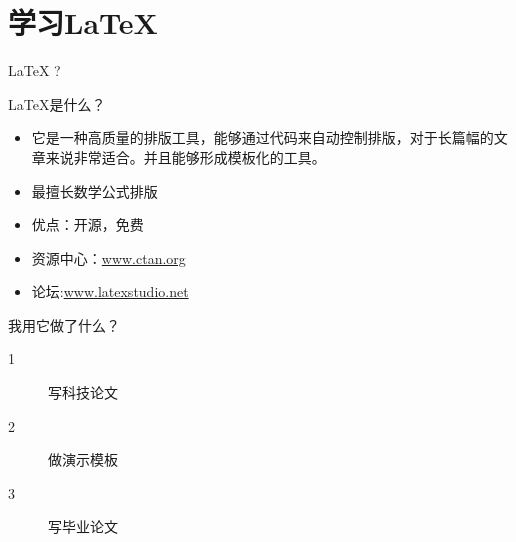 \documentclass{beamer}
\begin{document}
\section{学习\LaTeX{}}

	\begin{frame}{\LaTeX{} ?}
		\begin{block}{\LaTeX{}是什么？}
			\begin{itemize}[<+->]
				\item 它是一种高质量的排版工具，能够通过代码来自动控制排版，对于长篇幅的文章来说非常适合。并且能够形成模板化的工具。
				\item 最擅长数学公式排版
				\item 优点：开源，免费 
				\item 资源中心：\url{www.ctan.org}
				\item 论坛:\url{www.latexstudio.net}
			\end{itemize}
			
		\end{block}
		\pause
		\begin{exampleblock}{我用它做了什么？}
			\begin{description}
				\item[1] 写科技论文
				\item[2] 做演示模板
				\item[3] 写毕业论文
			\end{description}
		\end{exampleblock}		
	\end{frame}	
	
\end{document}
